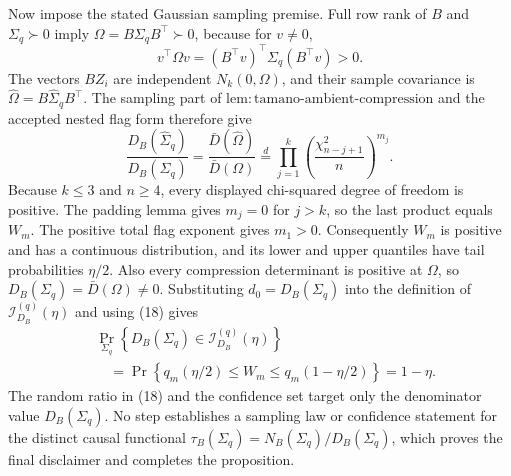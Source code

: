 Now impose the stated Gaussian sampling premise.  Full row rank of
\(B\) and \(\Sigma_q\succ0\) imply
\(\Omega=B\Sigma_qB^{\top}\succ0\), because for \(v\neq0\),
\[
 v^{\top}\Omega v=(B^{\top}v)^{\top}\Sigma_q(B^{\top}v)>0.
\]
The vectors \(BZ_i\) are independent \(N_k(0,\Omega)\), and their
sample covariance is
\(\widehat\Omega=B\widehat\Sigma_qB^{\top}\).  The sampling part of
\(\mathrm{lem{:}tamano\text{-}ambient\text{-}compression}\) and the
accepted nested flag form therefore give
\[
 \frac{D_B(\widehat\Sigma_q)}{D_B(\Sigma_q)}
 =\frac{\bar D(\widehat\Omega)}{\bar D(\Omega)}
 \stackrel{d}{=}
 \prod_{j=1}^{k}
 \left(\frac{\chi^2_{n-j+1}}{n}\right)^{m_j}.                       \tag{18}
\]
Because \(k\leq3\) and \(n\geq4\), every displayed chi-squared degree
of freedom is positive.  The padding lemma gives \(m_j=0\) for
\(j>k\), so the last product equals \(W_m\).  The positive total flag
exponent gives \(m_1>0\).  Consequently \(W_m\) is positive and has a
continuous distribution, and its lower and upper quantiles have tail
probabilities \(\eta/2\).  Also every compression determinant is
positive at \(\Omega\), so \(D_B(\Sigma_q)=\bar D(\Omega)\neq0\).
Substituting \(d_0=D_B(\Sigma_q)\) into the definition of
\(\mathcal I_{D_B}^{(q)}(\eta)\) and using (18) gives
\[
 \begin{aligned}
 &\Pr_{\Sigma_q}\!\left\{D_B(\Sigma_q)
       \in\mathcal I_{D_B}^{(q)}(\eta)\right\} \\
 &\quad=\Pr\!\left\{q_m(\eta/2)\leq W_m
       \leq q_m(1-\eta/2)\right\}=1-\eta.
 \end{aligned}
\]
The random ratio in (18) and the confidence set target only the
denominator value \(D_B(\Sigma_q)\).  No step establishes a sampling
law or confidence statement for the distinct causal functional
\(\tau_B(\Sigma_q)=N_B(\Sigma_q)/D_B(\Sigma_q)\), which proves the final
disclaimer and completes the proposition.
